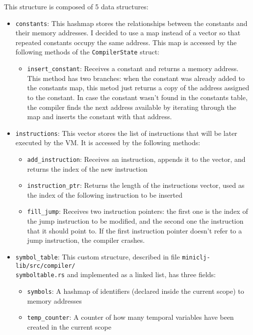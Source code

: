 \documentclass[11pt]{scrreprt}
\begin{document}
This structure is composed of 5 data structures:
\begin{itemize}
  \item \texttt{constants}: This hashmap stores the relationships between the constants and their memory addresses. I decided to use a map instead of a vector so that repeated constants occupy the same address. This map is accessed by the following methods of the \texttt{CompilerState} struct:
  \begin{itemize}
    \item \texttt{insert\_constant}: Receives a constant and returns a memory address. This method has two branches: when the constant was already added to the constants map, this metod just returns a copy of the address assigned to the constant. In case the constant wasn't found in the constants table, the compiler finds the next address available by iterating through the map and inserts the constant with that address.
  \end{itemize}
  \item \texttt{instructions}: This vector stores the list of instructions that will be later executed by the VM. It is accessed by the following methods:
  \begin{itemize}
    \item \texttt{add\_instruction}: Receives an instruction, appends it to the vector, and returns the index of the new instruction
    \item \texttt{instruction\_ptr}: Returns the length of the instructions vector, used as the index of the following instruction to be inserted
    \item \texttt{fill\_jump}: Receives two instruction pointers: the first one is the index of the jump instruction to be modified, and the second one the instruction that it should point to. If the first instruction pointer doesn't refer to a jump instruction, the compiler crashes.
  \end{itemize}
  \item \texttt{symbol\_table}: This custom structure, described in file \texttt{miniclj-lib/src/compiler/\\symboltable.rs} and implemented as a linked list, has three fields:
  \begin{itemize}
    \item \texttt{symbols}: A hashmap of identifiers (declared inside the current scope) to memory addresses
    \item \texttt{temp\_counter}: A counter of how many temporal variables have been created in the current scope

\end{itemize}
\end{itemize}
\end{document}
